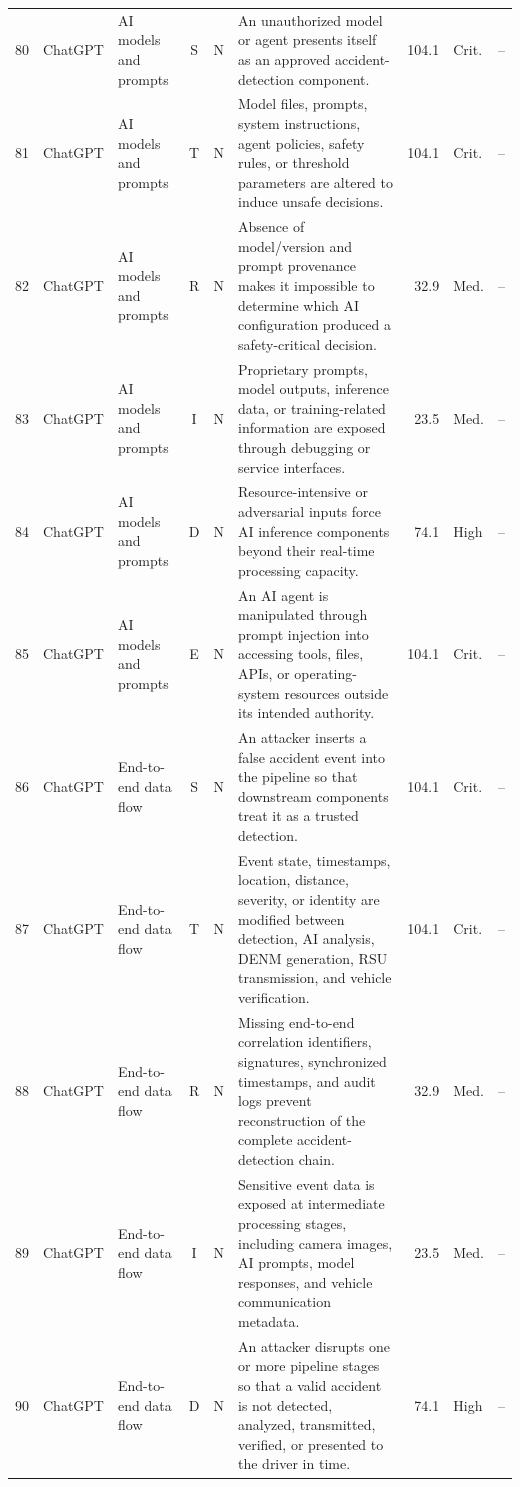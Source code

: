 \documentclass[9pt]{extarticle}
\begin{document}
\begin{longtable}{r l >{\raggedright\arraybackslash}p{2.6cm} c c >{\raggedright\arraybackslash}p{8.1cm} r l l}
80 & ChatGPT & AI models and prompts & S & N & An unauthorized model or agent presents itself as an approved accident-detection component. & 104.1 & Crit. & -- \\
81 & ChatGPT & AI models and prompts & T & N & Model files, prompts, system instructions, agent policies, safety rules, or threshold parameters are altered to induce unsafe decisions. & 104.1 & Crit. & -- \\
82 & ChatGPT & AI models and prompts & R & N & Absence of model/version and prompt provenance makes it impossible to determine which AI configuration produced a safety-critical decision. & 32.9 & Med. & -- \\
83 & ChatGPT & AI models and prompts & I & N & Proprietary prompts, model outputs, inference data, or training-related information are exposed through debugging or service interfaces. & 23.5 & Med. & -- \\
84 & ChatGPT & AI models and prompts & D & N & Resource-intensive or adversarial inputs force AI inference components beyond their real-time processing capacity. & 74.1 & High & -- \\
85 & ChatGPT & AI models and prompts & E & N & An AI agent is manipulated through prompt injection into accessing tools, files, APIs, or operating-system resources outside its intended authority. & 104.1 & Crit. & -- \\
86 & ChatGPT & End-to-end data flow & S & N & An attacker inserts a false accident event into the pipeline so that downstream components treat it as a trusted detection. & 104.1 & Crit. & -- \\
87 & ChatGPT & End-to-end data flow & T & N & Event state, timestamps, location, distance, severity, or identity are modified between detection, AI analysis, DENM generation, RSU transmission, and vehicle verification. & 104.1 & Crit. & -- \\
88 & ChatGPT & End-to-end data flow & R & N & Missing end-to-end correlation identifiers, signatures, synchronized timestamps, and audit logs prevent reconstruction of the complete accident-detection chain. & 32.9 & Med. & -- \\
89 & ChatGPT & End-to-end data flow & I & N & Sensitive event data is exposed at intermediate processing stages, including camera images, AI prompts, model responses, and vehicle communication metadata. & 23.5 & Med. & -- \\
90 & ChatGPT & End-to-end data flow & D & N & An attacker disrupts one or more pipeline stages so that a valid accident is not detected, analyzed, transmitted, verified, or presented to the driver in time. & 74.1 & High & -- \\

\end{longtable}
\end{document}
